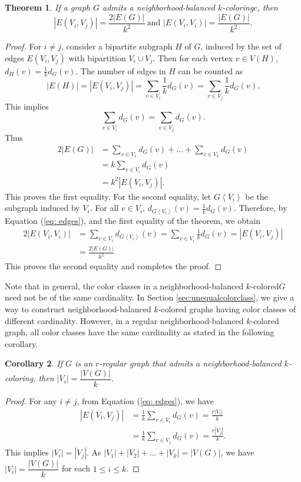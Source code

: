 \documentclass[12pt]{article}
\newtheorem{theorem}{Theorem}[section]
\newtheorem{corollary}[theorem]{Corollary}
\newcommand{\nbc}{neighborhood-balanced $k$-coloring\xspace}
\newcommand{\nbcd}{neighborhood-balanced $k$-colored\xspace}
\begin{document}
\begin{theorem}\label{th:thm1}
    If a graph $G$ admits a \nbc $c$, then
    $$|E(V_i, V_j)|=\frac{2|E(G)|}{k^2}\ \text{and }|E(V_i, V_i)|=\frac{|E(G)|}{k^2}. $$
\end{theorem}
\begin{proof}
    For $i \ne j$, consider a bipartite subgraph $H$ of $G$, induced by the set of edges $E(V_i, V_j)$ with bipartition $V_i \cup V_j$.
    Then for each vertex $v\in V(H)$, $d_H(v) = \frac{1}{k}d_G(v)$.
    The number of edges in $H$ can be counted as
    \begin{equation}\label{eq: edges}
      |E(H)| = |E(V_i, V_j)|=\sum_{v\in V_i}\frac{1}{k}d_G(v)=\sum_{v\in V_j}\frac{1}{k}d_G(v).
    \end{equation}
    This implies $$\sum_{v\in V_i}d_G(v)=\sum_{v\in V_j}d_G(v).$$
    Thus
    \begin{align*}
      2|E(G)|&=\sum_{v\in V_1}d_G(v) + \dots + \sum_{v\in V_{k}}d_G(v)\\
      &=k\sum_{v \in V_i}d_G(v)\\
      &=k^2|E(V_i, V_j)|.
    \end{align*}
    This proves the first equality.
    For the second equality, let $G\left<V_i\right>$ be the subgraph induced by $V_i$.
    For all $v\in V_i$, $d_{G \left< V_i\right>}(v)=\frac{1}{k}d_G(v)$.
    Therefore, by Equation (\ref{eq: edges}), and the first equality of the theorem, we obtain
    \begin{align*}
        2|E(V_i, V_i)|&= \sum_{v \in V_i} d_{G\left<V_i\right>}(v) = \sum_{v \in V_i}\frac{1}{k}d_G(v) =|E(V_i, V_j)|\\
         &=\frac{2|E(G)|}{k^2}
    \end{align*}
    This proves the second equality and completes the proof.
\end{proof}

Note that in general, the color classes in a \nbcd $G$ need not be of the same cardinality.
In Section \ref{sec:unequalcolorclass}, we give a way to construct \nbcd graphs having color classes of different cardinality.
However, in a regular \nbcd graph, all color classes have the same cardinality as stated in the following corollary.

\begin{corollary}\label{th: regular graphs necessary condition}
If $G$ is an $r$-regular graph that admits a \nbc, then $|V_i|=\dfrac{|V(G)|}{k}$.
\end{corollary}
\begin{proof}
For any $i \ne j$, from Equation (\ref{eq: edges}), we have
    \begin{align*}
        |E(V_i, V_j)| &= \frac{1}{k} \sum_{v \in V_i} d_G(v) = \frac{r |V_i|}{k}\\
                      &= \frac{1}{k} \sum_{v \in V_j} d_G(v)=\frac{r |V_j|}{k}.
    \end{align*}
This implies $|V_i| = |V_j|$.
As $|V_1| +|V_2|+  \dots + |V_k| = |V(G)|$, we have $|V_i|=\dfrac{|V(G)|}{k}$ for each $1 \le i \le k$.
\end{proof}
    
\end{document}

